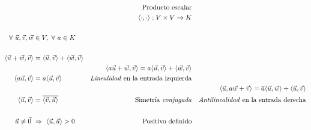 \documentclass[12pt,dvipsnames]{article}
\numberwithin{equation}{section}
\begin{document}
\begin{align*}
    & &\text{Producto escalar}& &\\
    & &\langle\cdot,\cdot\rangle:V\times V\to K & &\\
    \\
    \forall \ \vec{u}, \vec{v}, \vec{w}&\in V, \ \forall \ a\in K\\
    \\
    \langle\vec{u}+\vec{w},\vec{v}\rangle &= \langle \vec{u} , \vec{v} \rangle + \langle \vec{w} , \vec{v} \rangle \\
                                          & &\langle a\vec{u}+\vec{w} , \vec{v} \rangle = a \langle \vec{u} , \vec{v} \rangle + \langle \vec{w} , \vec{v} \rangle\\
    \langle a\vec{u} , \vec{v} \rangle &= a \langle \vec{u} , \vec{v} \rangle &\text{\emph{Linealidad} en la entrada izquierda} \\
                                       & & & &\langle \vec{u} , a\vec{w}+\vec{v} \rangle = \overline{a} \langle \vec{u} , \vec{w} \rangle + \langle \vec{u} , \vec{v} \rangle \\
    \langle \vec{u} , \vec{v} \rangle &= \overline{ \langle \vec{v} , \vec{u} \rangle} &\text{Simetría \emph{conjugada}} & &\text{\emph{Antilinealidad} en la entrada derecha}\\
    \\
    \vec{u}\neq\vec{0} \ &\Rightarrow \ \langle \vec{u}, \vec{u} \rangle > 0 &\text{Positivo definido}
\end{align*}
\end{document}
